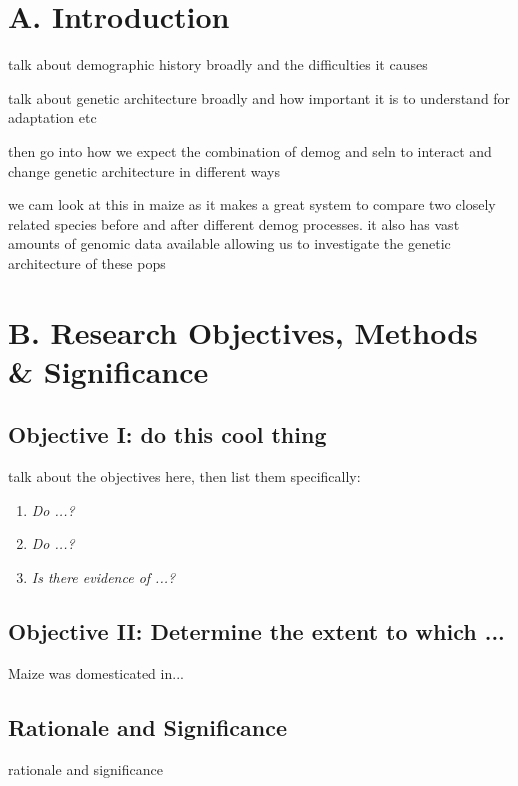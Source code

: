 
\section*{A. Introduction}


talk about demographic history broadly and the difficulties it causes

talk about genetic architecture broadly and how important it is to understand for adaptation etc 

then go into how we expect the combination of demog and seln to interact and change genetic architecture in different ways

we cam look at this in maize as it makes a great system to compare two closely related species before and after different demog processes. it also has vast amounts of genomic data available allowing us to investigate the genetic architecture of these pops



\section*{B. Research Objectives, Methods \& Significance}
\subsection*{Objective I: do this cool thing}
talk about the objectives here, then list them specifically:

\begin{enumerate}
\item \emph{Do ...?}
\item \emph{Do ...?}
\item \emph{Is there evidence of ...?}
\end{enumerate}

\subsection*{Objective II: Determine the extent to which ...}
Maize was domesticated in...


\subsection*{Rationale and Significance} 
 rationale and significance



